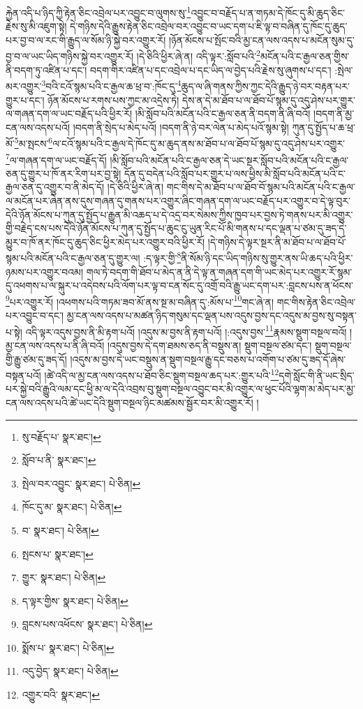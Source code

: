 རྐྱེན་འདི་པ་ཉིད་ཀྱི་རྟེན་ཅིང་འབྲེལ་པར་འབྱུང་བ་ལུགས་སུ་\footnote{སུ་བརྗོད་པ་  སྣར་ཐང་། }འབྱུང་བ་བརྗོད་པ་ན་གཏམ་དེ་ཁོང་དུ་མི་ཆུད་ཅིང་རྗེས་སུ་མི་འཇུག་སྟེ། དེ་གཉིས་དེའི་རྒྱུས་རྟེན་ཅིང་འབྲེལ་བར་འབྱུང་བ་ཡང་དག་པ་ཇི་ལྟ་བ་བཞིན་དུ་ཁོང་དུ་ཆུད་པར་བྱ་བ་ལ་རང་གི་རྒྱུད་ལ་སོམ་ཉི་སྐྱེ་བར་འགྱུར་རོ། །ཉོན་མོངས་པ་སྤོང་བའི་མྱ་ངན་ལས་འདས་པ་མངོན་སུམ་དུ་བྱ་བ་ལ་ཡང་ཡིད་གཉིས་སྐྱེ་བར་འགྱུར་རོ། །དེ་ཅིའི་ཕྱིར་ཞེ་ན། འདི་ལྟར་:སློབ་པའི་\footnote{སློབ་པ་ནི་  སྣར་ཐང་། }མངོན་པའི་ང་རྒྱལ་ཅན་གྱིས་ནི་བདག་ཏུ་འཛིན་པ་དང་། བདག་གིར་འཛིན་པ་དང་འབྲེལ་པ་དང་ཡིད་ལ་བྱེད་པའི་རྗེས་སུ་ཞུགས་པ་དང་། :སྤེལ་མར་འགྱུར་\footnote{སྤེལ་བར་འབྱུང་  སྣར་ཐང་།  པེ་ཅིན། }བའི་ངའོ་སྙམ་པའི་ང་རྒྱལ་ཆ་ཕྲ་བ་:ཁོང་དུ་\footnote{ཁོང་དུ་མ་  སྣར་ཐང་།  པེ་ཅིན། }ཆུད་ལ་ཞི་གནས་ཀྱིས་ཀྱང་དེའི་རྒྱུད་ཉེ་བར་བརྟན་པར་གྱུར་པ་དང་། ཉོན་མོངས་པ་རགས་པས་ཀྱང་མ་འདྲེས་ཏེ། དེས་ན་དེ་མ་ཐོབ་པ་ལ་ཐོབ་པོ་སྙམ་དུ་འདུ་ཤེས་པར་གྱུར་ལ་གཞན་དག་ལ་ཡང་བརྗོད་པའི་ཕྱིར་རོ། །མི་སློབ་པའི་མངོན་པའི་ང་རྒྱལ་ཅན་ནི་བདག་ནི་ཞི་བའོ། །བདག་ནི་མྱ་ངན་ལས་འདས་པའོ། །བདག་ནི་སྲེད་པ་མེད་པའོ། །བདག་ནི་ཉེ་བར་ལེན་པ་མེད་པའོ་སྙམ་སྟེ། ཀུན་དུ་སྤྱོད་པ་ཆ་ཕྲ་མོ་\footnote{བ་  སྣར་ཐང་།  པེ་ཅིན། }མ་སྤངས་\footnote{སྤངས་པ་  སྣར་ཐང་། }ལ་ངའོ་སྙམ་པའི་ང་རྒྱལ་དེ་ཁོང་དུ་མ་ཆུད་ནས་མ་ཐོབ་པ་ལ་ཐོབ་པོ་སྙམ་དུ་འདུ་ཤེས་པར་འགྱུར་\footnote{གྱུར་  སྣར་ཐང་།  པེ་ཅིན། }ལ་གཞན་དག་ལ་ཡང་བརྗོད་དོ། །མི་སློབ་པའི་མངོན་པའི་ང་རྒྱལ་ཅན་དེ་ཡང་སྔར་སློབ་པའི་མངོན་པའི་ང་རྒྱལ་ཅན་དུ་གྱུར་པ་ཁོ་ནར་རིག་པར་བྱ་སྟེ། དོན་དུ་བདེན་པའི་སློབ་པར་གྱུར་པ་ལས་ཕྱིས་མི་སློབ་པའི་མངོན་པའི་ང་རྒྱལ་ཅན་དུ་འགྱུར་བ་ནི་མེད་དོ། །དེ་ཅིའི་ཕྱིར་ཞེ་ན། གང་གིས་དེ་མ་ཐོབ་པ་ལ་ཐོབ་བོ་སྙམ་པའི་མངོན་པའི་ང་རྒྱལ་ལ་མངོན་པར་ཞེན་ནས་དུས་གཞན་དུ་གནས་པར་འགྱུར་ཞིང་གཞན་དག་ལ་ཡང་བརྗོད་པར་འགྱུར་བ་དེ་ལྟ་བུར་དེའི་ཉོན་མོངས་པ་ཀུན་དུ་སྤྱོད་པ་རྒྱུན་མི་འཆད་པ་དེ་འདྲ་བར་སེམས་ཀྱིས་ཁྱབ་པར་བྱས་ཏེ་གནས་པར་མི་འགྱུར་གྱི་བརྗེད་ངས་པས་དེའི་ཉོན་མོངས་པ་ཀུན་དུ་སྤྱོད་པ་ཆུང་ངུ་ཡུན་རིང་པོ་མི་གནས་པ་དང་ལྡན་པ་ཙམ་དུ་ཟད་དེ་མྱུར་བ་ཁོ་ནར་ཁོང་དུ་ཆུད་ཅིང་ཕྱིར་མེད་པར་འགྱུར་བའི་ཕྱིར་རོ། །དེ་གཉིས་དེ་ལྟར་སྔར་ནི་མ་ཐོབ་པ་ལ་ཐོབ་པོ་སྙམ་པའི་མངོན་པའི་ང་རྒྱལ་ཅན་དུ་གྱུར་ལ། :ད་ལྟར་གྱི་\footnote{ད་ལྟར་གྱིས་  སྣར་ཐང་།  པེ་ཅིན། }ནི་སོམ་ཉི་དང་ཡིད་གཉིས་སུ་གྱུར་ནས་ཡི་ཆད་པའི་ཕྱིར་ཉམས་པར་འགྱུར་བའམ། གལ་ཏེ་བདག་གི་ཐོབ་པ་མེད་ན་ནི་དེ་ལྟ་ན་གཞན་དག་གི་ཡང་མེད་པར་འགྱུར་རོ་སྙམ་དུ་འཕགས་པ་ལ་སྐུར་པ་འདེབས་པའི་ལོག་པར་ལྟ་བ་ངན་སོང་དུ་འགྲོ་བའི་རྒྱུ་ཡང་དག་པར་:བླངས་པས་ན་ཕོངས་\footnote{བླངས་པས་འཕོངས་  སྣར་ཐང་།  པེ་ཅིན། }པར་འགྱུར་རོ། །འཕགས་པའི་གཏམ་ཟབ་མོ་ནས་སྔ་མ་བཞིན་དུ་:མོས་པ་\footnote{སྨོས་པ་  སྣར་ཐང་།  པེ་ཅིན། }གང་ཞེ་ན། གང་གིས་རྟེན་ཅིང་འབྲེལ་པར་འབྱུང་བ་དང་། མྱ་ངན་ལས་འདས་པ་མཚན་ཉིད་གསུམ་དང་ལྡན་པས་འདུས་བྱས་དང་འདུས་མ་བྱས་སུ་བསྟན་པ་སྟེ། འདི་ལྟར་འདུས་བྱས་ནི་མི་རྟག་པའོ། །འདུས་མ་བྱས་ནི་རྟག་པའོ། །:འདུས་བྱས་\footnote{འདུ་བྱེད་  སྣར་ཐང་།  པེ་ཅིན། }རྣམས་སྡུག་བསྔལ་བའོ། །མྱ་ངན་ལས་འདས་པ་ནི་ཞི་བའོ། །འདུས་བྱས་དེ་དག་ཐམས་ཅད་ནི་བསྡུས་ན། སྡུག་བསྔལ་ཙམ་དང་། སྡུག་བསྔལ་གྱི་རྒྱུ་ཙམ་དུ་ཟད་དོ། །འདུས་མ་བྱས་དེ་ཡང་བསྡུས་ན་སྡུག་བསྔལ་རྒྱུ་དང་བཅས་པ་འགོག་པ་ཙམ་དུ་ཟད་དོ་ཞེས་བསྟན་པའོ། །ཚེ་འདི་ལ་མྱ་ངན་ལས་འདས་པ་ཐོབ་ཅིང་སྡུག་བསྔལ་ཆད་པར་:གྱུར་པའི་\footnote{འགྱུར་བའི་  སྣར་ཐང་། }དགེ་སློང་གི་ནི་ཡང་སྲིད་པར་སྐྱེ་བའི་རྒྱུའི་ལམ་དང་ཕྱི་མ་ལ་དེའི་འབྲས་བུ་སྡུག་བསྔལ་འབྱུང་བར་མི་འགྱུར་ལ་ཕུང་པོའི་ལྷག་མ་མེད་པར་མྱ་ངན་ལས་འདས་པའི་ཚེ་ཡང་དེའི་སྡུག་བསྔལ་ཉིང་མཚམས་སྦྱོར་བར་མི་འགྱུར་རོ། །

